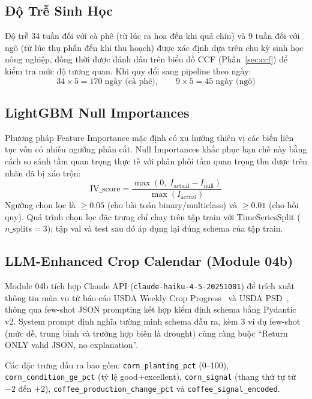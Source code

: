 \documentclass[conference]{IEEEtran}
\begin{document}
\subsection{Độ Trễ Sinh Học}

Độ trễ 34 tuần đối với cà phê (từ lúc ra hoa đến khi quả chín) và 9 tuần đối
với ngô (từ lúc thụ phấn đến khi thu hoạch) được xác định dựa trên chu kỳ
sinh học nông nghiệp, đồng thời được đánh dấu trên biểu đồ CCF
(Phần~\ref{sec:ccf}) để kiểm tra mức độ tương quan. Khi quy đổi sang pipeline
theo ngày:
\begin{equation}
34 \times 5 = 170 \;\text{ngày (cà phê)}, \qquad
9 \times 5 = 45 \;\text{ngày (ngô)}
\label{eq:lag_days}
\end{equation}

\subsection{LightGBM Null Importances}

Phương pháp Feature Importance mặc định có xu hướng thiên vị các biến liên
tục vốn có nhiều ngưỡng phân cắt. Null Importances khắc phục hạn chế này bằng
cách so sánh tầm quan trọng thực tế với phân phối tầm quan trọng thu được
trên nhãn đã bị xáo trộn:
\begin{equation}
\text{IV\_score} = \frac{\max(0,\; I_\text{actual} - I_\text{null})}
                       {\max(I_\text{actual})}
\label{eq:ivscore}
\end{equation}
Ngưỡng chọn lọc là $\geq 0.05$ (cho bài toán binary/multiclass) và
$\geq 0.01$ (cho hồi quy). Quá trình chọn lọc đặc trưng chỉ chạy trên tập
train với TimeSeriesSplit ($n\_\text{splits}=3$); tập val và test sau đó áp
dụng lại đúng schema của tập train.

\subsection{LLM-Enhanced Crop Calendar (Module 04b)}

Module 04b tích hợp Claude API (\texttt{claude-haiku-4-5-20251001}) để trích
xuất thông tin mùa vụ từ báo cáo USDA Weekly Crop Progress~\cite{usda_nass}
và USDA PSD~\cite{usda_fas}, thông qua few-shot JSON prompting kết hợp kiểm
định schema bằng Pydantic v2. System prompt định nghĩa tường minh schema đầu
ra, kèm 3 ví dụ few-shot (mức dễ, trung bình và trường hợp biên là drought)
cùng ràng buộc ``Return ONLY valid JSON, no explanation''.

Các đặc trưng đầu ra bao gồm: \texttt{corn\_planting\_pct} (0--100),
\texttt{corn\_condition\_ge\_pct} (tỷ lệ good+excellent),
\texttt{corn\_signal} (thang thứ tự từ $-2$ đến $+2$),
\texttt{coffee\_production\_change\_pct} và \texttt{coffee\_signal\_encoded}.
\end{document}
